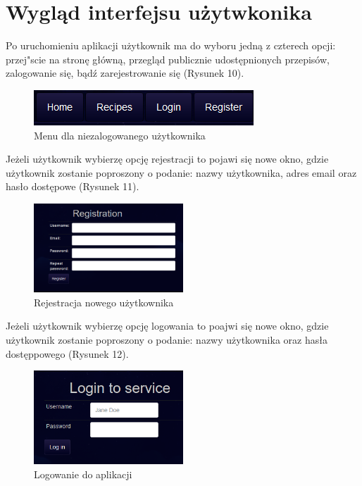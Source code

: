 \documentclass{article}
\begin{document}
\section{Wygląd interfejsu użytwkonika}
Po uruchomieniu aplikacji użytkownik ma do wyboru jedną z czterech opcji: przej"scie na stronę główną, przegląd publicznie udostępnionych przepisów, zalogowanie się, bądź zarejestrowanie się (Rysunek 10).
\begin{figure}[!ht]
  \centering
    \includegraphics[]{reshp1}\par\vspace{1cm}
  \caption{Menu dla niezalogowanego użytkownika}
\end{figure}

Jeżeli użytkownik wybierzę opcję rejestracji to pojawi się nowe okno, gdzie użytkownik zostanie poproszony o podanie: nazwy użytkownika, adres email oraz hasło dostępowe (Rysunek 11).
\begin{figure}[!ht]
  \centering
    \includegraphics[width=0.5\textwidth]{reshp2}\par\vspace{1cm}
  \caption{Rejestracja nowego użytkownika}
\end{figure}

Jeżeli użytkownik wybierzę opcję logowania to poajwi się nowe okno, gdzie użytkownik zostanie poproszony o podanie: nazwy użytkownika oraz hasła dostęppowego (Rysunek 12).
\begin{figure}[!ht]
  \centering
    \includegraphics[width=0.5\textwidth]{reshp3}\par\vspace{1cm}
  \caption{Logowanie do aplikacji}
\end{figure}
\end{document}
